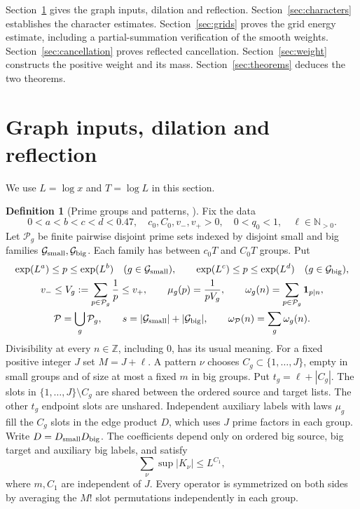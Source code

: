 \documentclass[11pt]{article}
\theoremstyle{definition}
\newtheorem{definition}[theorem]{Definition}
\newcommand{\Z}{\mathbb Z}
\newcommand{\N}{\mathbb N}
\newcommand{\ind}{\mathbf 1}
\newcommand{\Pset}{\mathcal P}
\theoremstyle{remark}
\begin{document}
Section~\ref{sec:graphs} gives the graph inputs, dilation and reflection.
Section~\ref{sec:characters} establishes the character estimates.
Section~\ref{sec:grids} proves the grid energy estimate, including
a partial-summation verification of the smooth weights.
Section~\ref{sec:cancellation} proves reflected cancellation.
Section~\ref{sec:weight} constructs the positive weight and its mass.
Section~\ref{sec:theorems} deduces the two theorems.

\section{Graph inputs, dilation and reflection}\label{sec:graphs}
We use $L=\log x$ and $T=\log L$ in this section.

\begin{definition}[Prime groups and patterns, {\cite[Definitions~3.1--3.3]{WeightedGraphs}}]
\label{def:graphs}
Fix the data
\begin{equation}\label{eq:fixed-data}
0<a<b<c<d<0.47,\quad c_0,C_0,v_-,v_+>0,\quad
0<q_0<1,\quad \ell\in\N_{>0}.
\end{equation}
Let $\Pset_g$ be finite pairwise disjoint prime sets indexed by disjoint
small and big families $\mathcal G_{\rm small},\mathcal G_{\rm big}$.
Each family has between $c_0T$ and $C_0T$ groups. Put
\begin{equation}\label{eq:groups}
\begin{gathered}
\exp(L^a)\le p\le\exp(L^b)\quad(g\in\mathcal G_{\rm small}),\qquad
\exp(L^c)\le p\le\exp(L^d)\quad(g\in\mathcal G_{\rm big}),\\
v_-\le V_g:=\sum_{p\in\Pset_g}\frac1p\le v_+,\qquad
\mu_g(p)=\frac1{pV_g},\qquad
\omega_g(n)=\sum_{p\in\Pset_g}\ind_{p\mid n},\\
\Pset=\bigcup_g\Pset_g,\qquad s=|\mathcal G_{\rm small}|+
|\mathcal G_{\rm big}|,\qquad\omega_{\Pset}(n)=\sum_g\omega_g(n).
\end{gathered}
\end{equation}
Divisibility at every $n\in\Z$, including $0$, has its usual meaning.
For a fixed positive integer $J$ set $M=J+\ell$.
A pattern $\nu$ chooses $C_g\subset\{1,\ldots,J\}$, empty in small
groups and of size at most a fixed $m$ in big groups. Put
$t_g=\ell+|C_g|$. The slots in $\{1,\ldots,J\}\setminus C_g$
are shared between the ordered source and target lists.
The other $t_g$ endpoint slots are unshared. Independent auxiliary
labels with laws $\mu_g$ fill the $C_g$ slots in the edge product $D$,
which uses $J$ prime factors in each group.
Write $D=D_{\rm small}D_{\rm big}$.
The coefficients depend only on ordered big source, big target and
auxiliary big labels, and satisfy
\begin{equation}\label{eq:pattern-cost}
\sum_\nu\sup|K_\nu|\le L^{C_1},
\end{equation}
where $m,C_1$ are independent of $J$. Every operator is symmetrized
on both sides by averaging the $M!$ slot permutations independently
in each group.
\end{definition}
\end{document}
